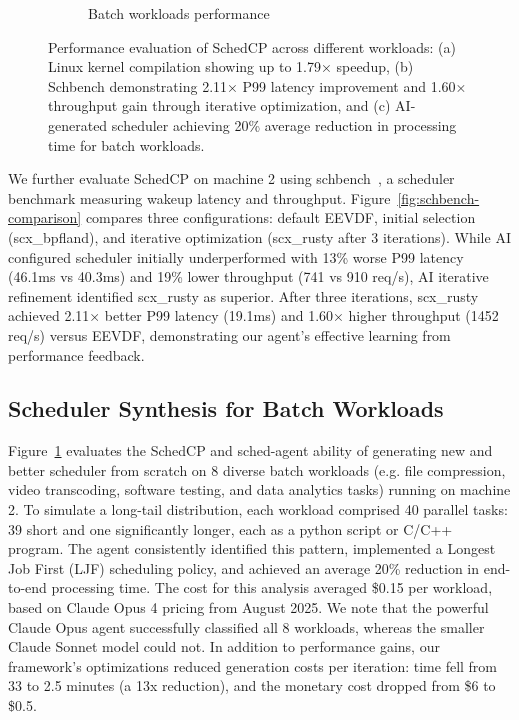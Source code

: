 \documentclass[preprint]{article}
\newcommand{\sys}{SchedCP\xspace}
\newcommand{\agent}{sched-agent\xspace}
\begin{document}
\begin{figure}[h]
\begin{minipage}{0.48\textwidth}
\begin{subfigure}[b]{\textwidth}
        \caption{Batch workloads performance}
        \label{fig:batch-performance}
    \end{subfigure}
\end{minipage}
\caption{Performance evaluation of \sys across different workloads: (a) Linux kernel compilation showing up to 1.79× speedup, (b) Schbench demonstrating 2.11× P99 latency improvement and 1.60× throughput gain through iterative optimization, and (c) AI-generated scheduler achieving 20\% average reduction in processing time for batch workloads.}
\label{fig:combined-performance}
\end{figure}

We further evaluate \sys on machine 2 using schbench~\cite{schbench2016}, a scheduler benchmark measuring wakeup latency and throughput. Figure~\ref{fig:schbench-comparison} compares three configurations: default EEVDF, initial selection (scx\_bpfland), and iterative optimization (scx\_rusty after 3 iterations). While AI configured scheduler initially underperformed with 13\% worse P99 latency (46.1ms vs 40.3ms) and 19\% lower throughput (741 vs 910 req/s), AI iterative refinement identified scx\_rusty as superior. After three iterations, scx\_rusty achieved 2.11× better P99 latency (19.1ms) and 1.60× higher throughput (1452 req/s) versus EEVDF, demonstrating our agent's effective learning from performance feedback.

\subsection{Scheduler Synthesis for Batch Workloads}

Figure~\ref{fig:batch-performance} evaluates the \sys  and \agent  ability of generating new and better scheduler from scratch on 8 diverse batch workloads (e.g. file compression, video transcoding, software testing, and data analytics tasks) running on machine 2. To simulate a long-tail distribution, each workload comprised 40 parallel tasks: 39 short and one significantly longer, each as a python script or C/C++ program. The agent consistently identified this pattern, implemented a Longest Job First (LJF) scheduling policy, and achieved an average 20\% reduction in end-to-end processing time. The cost for this analysis averaged \$0.15 per workload, based on Claude Opus 4 pricing from August 2025. We note that the powerful Claude Opus agent successfully classified all 8 workloads, whereas the smaller Claude Sonnet model could not. In addition to performance gains, our framework's optimizations reduced generation costs per iteration: time fell from 33 to 2.5 minutes (a 13x reduction), and the monetary cost dropped from \$6 to \$0.5.
\end{document}
